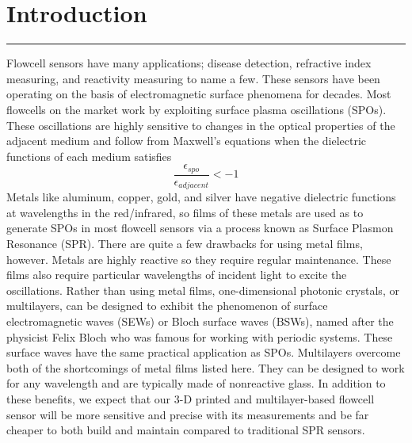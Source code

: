 \documentclass{report}
\begin{document}
	\selectfont
    \RaggedRight
    \section*{Introduction}
    \vspace{-0.1cm}\hrule\vspace{0.2cm}
    \par{\indent Flowcell sensors have many applications; disease detection, refractive index measuring, and reactivity measuring to name a few. These sensors have been operating on the basis of electromagnetic surface phenomena for decades. Most flowcells on the market work by exploiting surface plasma oscillations (SPOs). These oscillations are highly sensitive to changes in the optical properties of the adjacent medium and follow from Maxwell's equations when the dielectric functions of each medium satisfies
    \[
        \frac{\epsilon_{spo}}{\epsilon_{adjacent}} < -1
    \]
		Metals like aluminum, copper, gold, and silver have negative dielectric functions at wavelengths in the red/infrared, so films of these metals are used as to generate SPOs in most flowcell sensors via a process known as Surface Plasmon Resonance (SPR). There are quite a few drawbacks for using metal films, however. Metals are highly reactive so they require regular maintenance. These films also require particular wavelengths of incident light to excite the oscillations. Rather than using metal films, one-dimensional photonic crystals, or multilayers, can be designed to exhibit the phenomenon of surface electromagnetic waves (SEWs) or Bloch surface waves (BSWs), named after the physicist Felix Bloch who was famous for working with periodic systems. These surface waves have the same practical application as SPOs. Multilayers overcome both of the shortcomings of metal films listed here. They can be designed to work for any wavelength and are typically made of nonreactive glass. In addition to these benefits, we expect that our 3-D printed and multilayer-based flowcell sensor will be more sensitive and precise with its measurements and be far cheaper to both build and maintain compared to traditional SPR sensors.}
\end{document}
